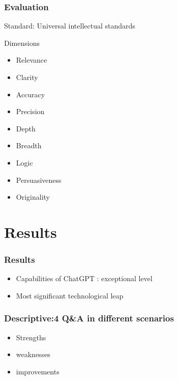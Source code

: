 \documentclass{beamer}
\begin{document}
\begin{frame}
    \frametitle{Evaluation}
    \Large{Standard: Universal intellectual standards}
    \begin{block}{Dimensions}
        \begin{multicols}{2}
            \begin{itemize}
                \item Relevance
                \item Clarity
                \item Accuracy
                \item Precision
                \item Depth
                \item Breadth
                \item Logic
                \item Persuasiveness
                \item Originality
            \end{itemize}
        \end{multicols}
    \end{block}
\end{frame}

\section{Results}
\begin{frame}
    \frametitle{Results}
    \LARGE
    \begin{itemize}[<+->]
        \item Capabilities of ChatGPT : exceptional level
        \item Most significant technological leap
    \end{itemize}
\end{frame}

\begin{frame}
    \frametitle{Descriptive:4 Q\&A in different scenarios}
    \LARGE
    \begin{itemize}
        \item Strengths
        \item weaknesses
        \item improvements
    \end{itemize}
\end{frame}
\end{document}

